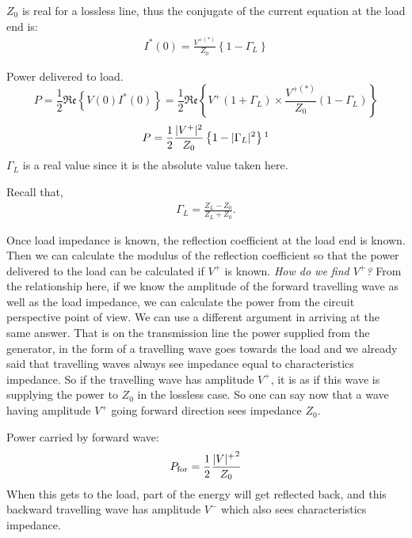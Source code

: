 $Z_0$ is real for a lossless line, thus the conjugate of the current equation at the load end is:
\begin{align*}
I^\ast (0) =\frac{V^{+ (\ast )}}{Z_0}\left\lbrace 1 -\Gamma_L \right\rbrace
\end{align*}

Power delivered to load.
\begin{dmath*}
P = \frac{1}{2}\mathfrak{Re}\left\lbrace V(0) I^\ast(0) \right\rbrace= \frac{1}{2}\mathfrak{Re}\left\lbrace V^+(1+\Gamma_L) \times\frac{V^{+(\ast)}}{Z_0} (1-\Gamma_L)\right\rbrace
\end{dmath*}
\begin{equation}
P = \frac{1}{2} \frac{|V^+|^2}{Z_0} \left\lbrace 1 -|\Gamma_L|^2 \right\rbrace\footnotemark
\end{equation}
$\Gamma_L$ is a real value since it is the absolute value taken here.

Recall that,
\begin{align*}\Gamma_L = \frac{ Z_L -Z_0 }{ Z_L + Z_0 }.
\end{align*}

Once load impedance is known, the reflection coefficient at the load end is known. Then we can calculate the modulus of the reflection coefficient so that the power delivered to the load can be calculated if $V^+$ is known. \emph{How do we find $V^+$?} From the relationship here, if we know the amplitude of the forward travelling wave as well as the load impedance, we can calculate the power from the circuit perspective point of view. We can use a different argument in arriving at the same answer. That is on the transmission line the power supplied from the generator, in the form of a travelling wave goes towards the load and we already said that travelling waves always see impedance equal to characteristics impedance. So if the travelling wave has amplitude $V^+$, it is as if this wave is supplying the power to $Z_0$ in the lossless case. So one can say now that a wave having amplitude $V^+$ going forward direction sees impedance $Z_0$.

Power carried by forward wave: 
\begin{align*}
P_{\textnormal{for}} = \frac{1}{2} \frac{{|V|^+}^2}{Z_0}
\end{align*}
When this gets to the load, part of the energy will get reflected back, and this backward travelling wave has amplitude $V^-$ which also sees characteristics impedance.

